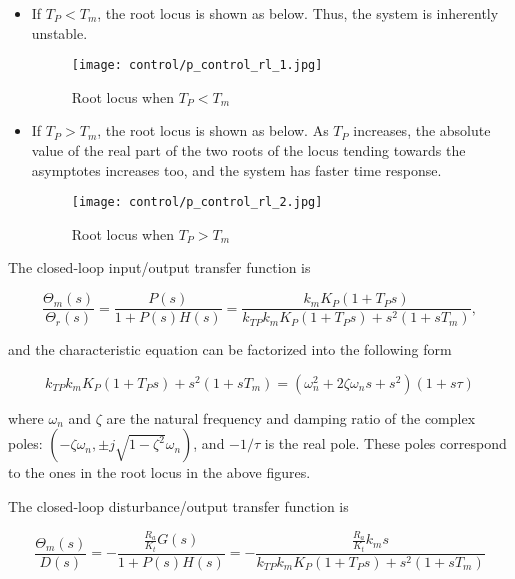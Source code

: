 \documentclass[10pt]{article}
\begin{document}
\begin{itemize}
    \item If $T_{P}<T_{m}$, the root locus is shown as below.  Thus, the system is inherently unstable.

    \begin{figure}[H]
    \centering
    \texttt{[image: control/p\_control\_rl\_1.jpg]}
    \caption{Root locus when $T_{P}<T_{m}$}
    \label{fig.p_control_rl_1}
\end{figure}


 

    \item If $T_{P}>T_{m}$, the root locus is shown as below.  As $T_{P}$ increases, the absolute value of the real part of the two roots of the locus tending towards the asymptotes increases too, and the system has faster time response. 

        \begin{figure}[H]
    \centering
    \texttt{[image: control/p\_control\_rl\_2.jpg]}
    \caption{Root locus when $T_{P}>T_{m}$}
    \label{fig.p_control_rl_2}
\end{figure}

\end{itemize}







The closed-loop input/output transfer function is

$$
\frac{\Theta_{m}(s)}{\Theta_{r}(s)}=\frac{P(s)}{1+P(s)H(s)}=\frac{{k_{m}K_P(1+T_Ps)}}{k_{TP}k_{m}K_P(1+T_Ps)+s^2(1+sT_m)},
$$

and the characteristic equation can be factorized into the following form


$$
{k_{TP}k_{m}K_P(1+T_Ps)+s^2(1+sT_m)}
=
{\left({\omega_{n}^{2}}+{2 \zeta }{\omega_{n}}s+{s^{2}}\right)(1+s \tau)}
$$


where $\omega_{n}$ and $\zeta$ are the natural frequency and damping ratio of the complex poles: $\left(-\zeta \omega_{n}, \pm j \sqrt{1-\zeta^{2}} \omega_{n}\right)$, and $-1 / \tau$ is the real pole. 
These poles correspond to the ones in the root locus in the above figures.




 The closed-loop disturbance/output transfer function is

$$
\frac{\Theta_{m}(s)}{D(s)}=-\frac{\frac{R_a}{K_t}G(s)}{1+P(s)H(s)}=-\frac{\frac{R_a}{K_t}k_ms}{k_{TP}k_{m}K_P(1+T_Ps)+s^2(1+sT_m)}
$$
\end{document}
